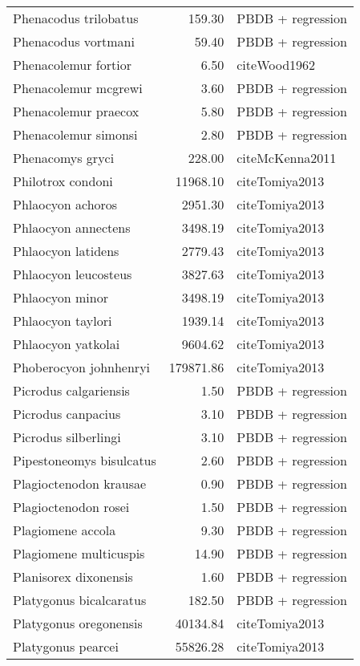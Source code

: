 \begin{table}[ht]
\begin{tabular}{lrl}
  Phenacodus trilobatus & 159.30 & PBDB + regression \\ 
  Phenacodus vortmani & 59.40 & PBDB + regression \\ 
  Phenacolemur fortior & 6.50 & cite{Wood1962} \\ 
  Phenacolemur mcgrewi & 3.60 & PBDB + regression \\ 
  Phenacolemur praecox & 5.80 & PBDB + regression \\ 
  Phenacolemur simonsi & 2.80 & PBDB + regression \\ 
  Phenacomys gryci & 228.00 & cite{McKenna2011} \\ 
  Philotrox condoni & 11968.10 & cite{Tomiya2013} \\ 
  Phlaocyon achoros & 2951.30 & cite{Tomiya2013} \\ 
  Phlaocyon annectens & 3498.19 & cite{Tomiya2013} \\ 
  Phlaocyon latidens & 2779.43 & cite{Tomiya2013} \\ 
  Phlaocyon leucosteus & 3827.63 & cite{Tomiya2013} \\ 
  Phlaocyon minor & 3498.19 & cite{Tomiya2013} \\ 
  Phlaocyon taylori & 1939.14 & cite{Tomiya2013} \\ 
  Phlaocyon yatkolai & 9604.62 & cite{Tomiya2013} \\ 
  Phoberocyon johnhenryi & 179871.86 & cite{Tomiya2013} \\ 
  Picrodus calgariensis & 1.50 & PBDB + regression \\ 
  Picrodus canpacius & 3.10 & PBDB + regression \\ 
  Picrodus silberlingi & 3.10 & PBDB + regression \\ 
  Pipestoneomys bisulcatus & 2.60 & PBDB + regression \\ 
  Plagioctenodon krausae & 0.90 & PBDB + regression \\ 
  Plagioctenodon rosei & 1.50 & PBDB + regression \\ 
  Plagiomene accola & 9.30 & PBDB + regression \\ 
  Plagiomene multicuspis & 14.90 & PBDB + regression \\ 
  Planisorex dixonensis & 1.60 & PBDB + regression \\ 
  Platygonus bicalcaratus & 182.50 & PBDB + regression \\ 
  Platygonus oregonensis & 40134.84 & cite{Tomiya2013} \\ 
  Platygonus pearcei & 55826.28 & cite{Tomiya2013} \\ 

\end{tabular}
\end{table}
